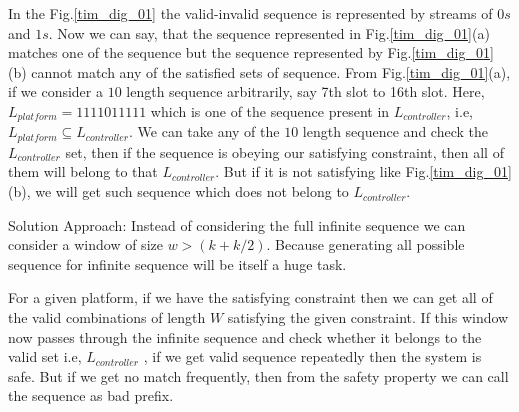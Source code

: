 In the Fig.\ref{tim_dig_01} the valid-invalid sequence is represented by streams of $0s$ and $1s$.
Now  we can say, that the sequence represented in Fig.\ref{tim_dig_01}(a) matches one
of the sequence but the sequence represented by Fig.\ref{tim_dig_01}(b) cannot match any of the 
satisfied sets of sequence. From Fig.\ref{tim_dig_01}(a), if we consider a $10$ length sequence
arbitrarily, say 7th slot to 16th slot. Here, $L_{platform} = 1111011111$ which is one of the
sequence present in $L_{controller}$, i.e, $L_{platform} \subseteq L_{controller}$. We can take
any of the $10$ length sequence and check the $L_{controller}$ set, then if the sequence is obeying
our satisfying constraint, then all of them will belong to that $L_{controller}$. But if it is not satisfying
like Fig.\ref{tim_dig_01}(b), we will get such sequence which does not belong to $L_{controller}$.


Solution Approach:
Instead of considering the full infinite sequence we can consider a window of size $w > (k + k/2)$. 
Because generating all possible sequence for infinite sequence will be itself a huge task.

For a given platform, if we have the satisfying constraint then we can get all of the valid
combinations of length $W$ satisfying the given constraint. If this window now passes through 
the infinite sequence and check whether it belongs to the valid set i.e, $L_{controller}$ , if 
we get valid sequence repeatedly then the system is safe. But if we get no match frequently, then 
from the safety property we can call the sequence as bad prefix.


